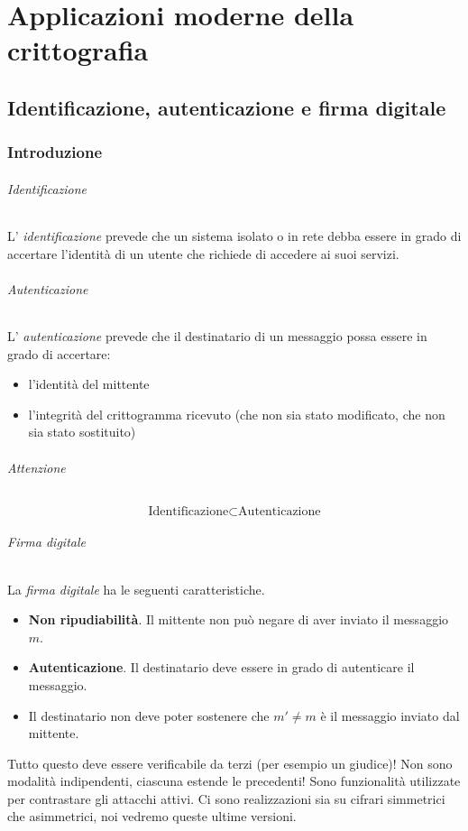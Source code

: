 \part{Applicazioni moderne della crittografia}

\chapter{Identificazione, autenticazione e firma digitale}

\section{Introduzione}
\paragraph{Identificazione} L' \emph{identificazione} prevede che un sistema isolato o in rete debba essere in grado di accertare l'identità di un utente che richiede di accedere ai suoi servizi.

\paragraph{Autenticazione} L' \emph{autenticazione} prevede che il destinatario di un messaggio possa essere in grado di accertare:
\begin{itemize}
    \item l'identità del mittente
    \item l'integrità del crittogramma ricevuto (che non sia stato modificato, che non sia stato sostituito)
\end{itemize}
\paragraph{Attenzione}\[\boxed{\text{Identificazione} \subset \text{Autenticazione}}\]
\paragraph{Firma digitale}
La \emph{firma digitale} ha le seguenti caratteristiche.
\begin{itemize}
    \item \textbf{{Non ripudiabilità}}. Il mittente non può negare di aver inviato il messaggio $m$.
    \item \textbf{{Autenticazione}}. Il destinatario deve essere in grado di autenticare il messaggio.
    \item Il destinatario non deve poter sostenere che $m' \neq m$ è il messaggio inviato dal mittente.
\end{itemize}
Tutto questo deve essere verificabile da terzi (per esempio un giudice)! Non sono modalità indipendenti, ciascuna estende le precedenti! Sono funzionalità utilizzate per contrastare gli attacchi attivi. Ci sono realizzazioni sia su cifrari simmetrici che asimmetrici, noi vedremo queste ultime versioni.

